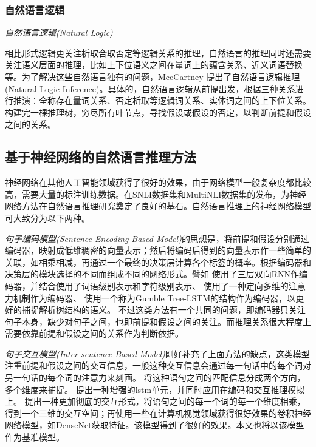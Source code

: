 \documentclass[UTF8,11pt,a4paper,nofonts]{ctexart}
\begin{document}
\subsubsection{自然语言逻辑}

\textit{自然语言逻辑(Natural Logic)}

相比形式逻辑更关注析取合取否定等逻辑关系的推理，自然语言的推理同时还需要关注语义层面的推理，比如上下位语义之间在量词上的蕴含关系、近义词语替换等。为了解决这些自然语言独有的问题，MccCartney 提出了自然语言逻辑推理(Natural Logic Inference)\cite{}。具体的，自然语言逻辑从前提出发，根据三种关系进行推演：全称存在量词关系、否定析取等逻辑词关系、实体词之间的上下位关系。构建完一棵推理树，穷尽所有叶节点，寻找假设或假设的否定，以判断前提和假设之间的关系。



\subsection{基于神经网络的自然语言推理方法}

神经网络在其他人工智能领域获得了很好的效果，由于网络模型一般复杂度都比较高，需要大量的标注训练数据。在SNLI数据集\cite{}和MultiNLI数据集的发布，为神经网络方法在自然语言推理研究奠定了良好的基石。自然语言推理上的神经网络模型可大致分为以下两种。

\textit{句子编码模型(Sentence Encoding Based Model)}\cite{}的思想是，将前提和假设分别通过编码器，映射成低维稠密的向量表示；然后将编码后得到的向量表示作一些简单的关联，如相乘相减，再通过一个最终的决策层计算各个标签的概率。根据编码器和决策层的模块选择的不同而组成不同的网络形式。譬如
\cite{Chen2017Recurrent}使用了三层双向RNN作编码器，并结合使用了词语级别表示和字符级别表示、
\cite{Shen2017DiSAN}使用了一种定向多维的注意力机制作为编码器、
\cite{Gumble}使用一个称为Gumble Tree-LSTM的结构作为编码器，以更好的捕捉解析树结构的语义。
不过这类方法有一个共同的问题，即编码器只关注句子本身，缺少对句子之间，也即前提和假设之间的关注。而推理关系很大程度上需要依靠前提和假设之间的关系作为判断依据。


\textit{句子交互模型(Inter-sentence Based Model)}刚好补充了上面方法的缺点，这类模型注重前提和假设之间的交互信息，一般这种交互信息会通过每一句话中的每个词对另一句话的每个词的注意力来刻画。
\cite{Wang2017Bilateral}将这种语句之间的匹配信息分成两个方向，多个维度来捕捉。
\cite{Enhanced}提出一种增强的lstm单元，并同时应用在编码和交互推理模拟上。
\cite{Diin}提出一种更加彻底的交互形式，将语句之间的每一个词的每一个维度相乘，得到一个三维的交互空间；再使用一些在计算机视觉领域获得很好效果的卷积神经网络模型，如DenseNet\cite{}获取特征。该模型得到了很好的效果。本文也将以该模型作为基准模型。
\end{document}
